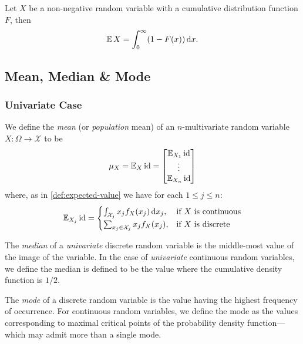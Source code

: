 \begin{proposition}
    \label{prop:expectation-nonnegative-random-variable}
    Let \(X\) be a non-negative random variable with a cumulative distribution
    function \(F\), then
    \[
        \operatorname{\mathbb{E}} X = \int_0^{\infty} (1 - F(x))\, \mathrm{d} x.
    \]
\end{proposition}


\subsection{Mean, Median \& Mode}

\subsubsection{Univariate Case}

\begin{definition}
    \label{def:mean-of-random-variable}
    We define the \emph{mean} (or \emph{population} mean) of an \(n\)-multivariate
    random variable \(X: \Omega \to \mathcal{X}\) to be
    \[
        \mu_X = \operatorname{\mathbb{E}}_X \operatorname{id} =
        \begin{bmatrix}
            \operatorname{\mathbb{E}}_{X_1} \operatorname{id} \\
            \vdots            \\
            \operatorname{\mathbb{E}}_{X_n} \operatorname{id}
        \end{bmatrix}
    \]
    where, as in \cref{def:expected-value} we have for each \(1 \leq j \leq n\):
    \[
        \operatorname{\mathbb{E}}_{X_j} \operatorname{id} =
        \begin{cases}
            \int_{\mathcal{X}_j} x_j f_X(x_j)\, \mathrm{d} x_j, & \text{if } X \text{ is
            continuous}                                                                       \\
            \sum_{x_j \in \mathcal{X}_j} x_j f_X(x_j),     & \text{if } X \text{ is discrete}
        \end{cases}
    \]

    The \emph{median} of a \emph{univariate} discrete random variable is the
    middle-most value of the image of the variable. In the case of \emph{univariate}
    continuous random variables, we define the median is defined to be the value
    where the cumulative density function is \(1/2\).

    The \emph{mode} of a discrete random variable is the value having the highest
    frequency of occurrence. For continuous random variables, we define the mode as
    the values corresponding to maximal critical points of the probability density
    function---which may admit more than a single mode.
\end{definition}

